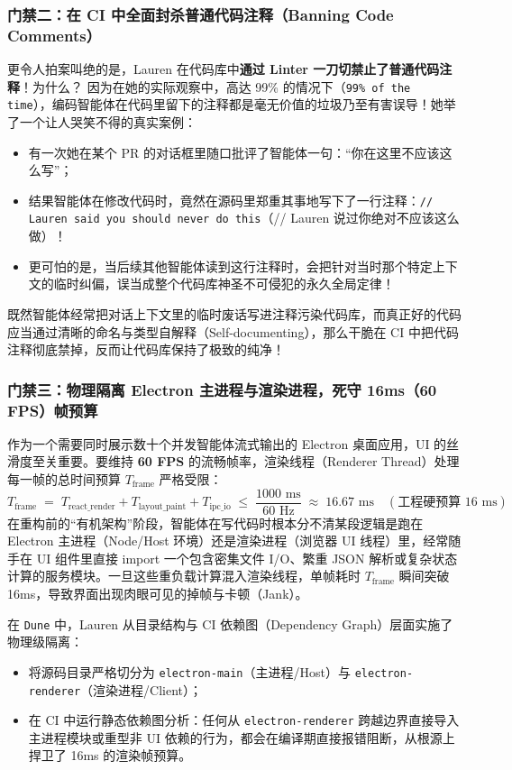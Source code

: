 \documentclass[a4paper]{article}
\begin{document}
\subsubsection{门禁二：在 CI 中全面封杀普通代码注释（Banning Code Comments）}
更令人拍案叫绝的是，Lauren 在代码库中\textbf{通过 Linter 一刀切禁止了普通代码注释}！为什么？
因为在她的实际观察中，高达 99\% 的情况下（\texttt{99\% of the time}），编码智能体在代码里留下的注释都是毫无价值的垃圾乃至有害误导！她举了一个让人哭笑不得的真实案例：
\begin{itemize}
  \item 有一次她在某个 PR 的对话框里随口批评了智能体一句：“你在这里不应该这么写”；
  \item 结果智能体在修改代码时，竟然在源码里郑重其事地写下了一行注释：\texttt{// Lauren said you should never do this}（// Lauren 说过你绝对不应该这么做）！
  \item 更可怕的是，当后续其他智能体读到这行注释时，会把针对当时那个特定上下文的临时纠偏，误当成整个代码库神圣不可侵犯的永久全局定律！
\end{itemize}
既然智能体经常把对话上下文里的临时废话写进注释污染代码库，而真正好的代码应当通过清晰的命名与类型自解释（Self-documenting），那么干脆在 CI 中把代码注释彻底禁掉，反而让代码库保持了极致的纯净！

\subsubsection{门禁三：物理隔离 Electron 主进程与渲染进程，死守 16ms（60 FPS）帧预算}
作为一个需要同时展示数十个并发智能体流式输出的 Electron 桌面应用，UI 的丝滑度至关重要。要维持 \textbf{60 FPS} 的流畅帧率，渲染线程（Renderer Thread）处理每一帧的总时间预算 $T_{\text{frame}}$ 严格受限：
\begin{equation}
  T_{\text{frame}} \;=\; T_{\text{react\_render}} + T_{\text{layout\_paint}} + T_{\text{ipc\_io}} \;\le\; \frac{1000\text{ ms}}{60\text{ Hz}} \;\approx\; 16.67\text{ ms} \quad (\text{工程硬预算 } 16\text{ ms})
\end{equation}
在重构前的“有机架构”阶段，智能体在写代码时根本分不清某段逻辑是跑在 Electron 主进程（Node/Host 环境）还是渲染进程（浏览器 UI 线程）里，经常随手在 UI 组件里直接 import 一个包含密集文件 I/O、繁重 JSON 解析或复杂状态计算的服务模块。一旦这些重负载计算混入渲染线程，单帧耗时 $T_{\text{frame}}$ 瞬间突破 16ms，导致界面出现肉眼可见的掉帧与卡顿（Jank）。

在 \texttt{Dune} 中，Lauren 从目录结构与 CI 依赖图（Dependency Graph）层面实施了物理级隔离：
\begin{itemize}
  \item 将源码目录严格切分为 \texttt{electron-main}（主进程/Host）与 \texttt{electron-renderer}（渲染进程/Client）；
  \item 在 CI 中运行静态依赖图分析：任何从 \texttt{electron-renderer} 跨越边界直接导入主进程模块或重型非 UI 依赖的行为，都会在编译期直接报错阻断，从根源上捍卫了 16ms 的渲染帧预算。
\end{itemize}
\end{document}
